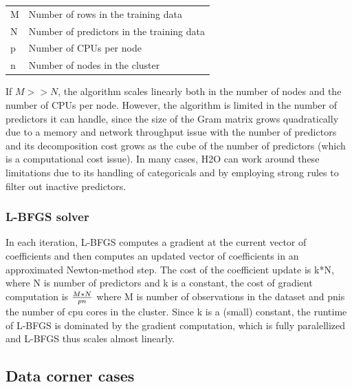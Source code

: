 \bigskip

\begin{center}
    \begin{tabular}{ l l }
    M & Number of rows in the training data \\
    N & Number of predictors in the training data \\
    p & Number of CPUs per node \\
    n & Number of nodes in the cluster \\
    \end{tabular}
\end{center}

\bigskip

If $M >> N$, the algorithm scales linearly both in the number of nodes and the number of CPUs per node. However,
the algorithm is limited in the number of predictors it can handle, since the size of the Gram matrix grows
quadratically due to a memory and network throughput issue with the number of predictors and its decomposition
cost grows as the cube of the number of predictors (which is a computational cost issue). In many cases, H2O can
work around these limitations due to its handling of categoricals and by employing strong rules to filter out
inactive predictors.

\subsubsection{L-BFGS solver}
In each iteration, L-BFGS computes a gradient at the current vector of coefficients and then computes an updated vector of coefficients in an approximated Newton-method step. The cost of the coefficient update is k*N, where N is number of predictors and k is a constant, the cost of gradient computation is $M*N\over pn$ where M is number of observations in the dataset and pnis the number of cpu cores in the cluster. Since k is a (small) constant, the runtime of L-BFGS is dominated by the gradient computation, which is fully paralellized and L-BFGS thus scales almost linearly. 

\subsection{Data corner cases}

